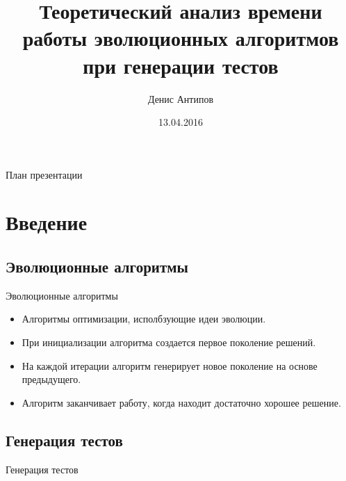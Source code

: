 \documentclass{beamer}
\begin{document}
\title[Автоматическая генерация тестов]{Теоретический анализ времени работы эволюционных алгоритмов при генерации тестов}
\author[Денис Антипов]{Денис Антипов}
\date{13.04.2016}

 
\begin{frame}
 \maketitle
\end{frame}
 
 \begin{frame}{План презентации}
  \tableofcontents
 \end{frame}

 \section{Введение}
 \subsection{Эволюционные алгоритмы}
 \begin{frame}{Эволюционные алгоритмы}
  \begin{itemize}
   \item Алгоритмы оптимизации, исполбзующие идеи эволюции.
   \item При инициализации алгоритма создается первое поколение решений.
   \item На каждой итерации алгоритм генерирует новое поколение на основе предыдущего.
   \item Алгоритм заканчивает работу, когда находит достаточно хорошее решение.
  \end{itemize}
 \end{frame}
 
 \subsection{Генерация тестов}
 \begin{frame}{Генерация тестов}
  
 \end{frame}
\end{document}
